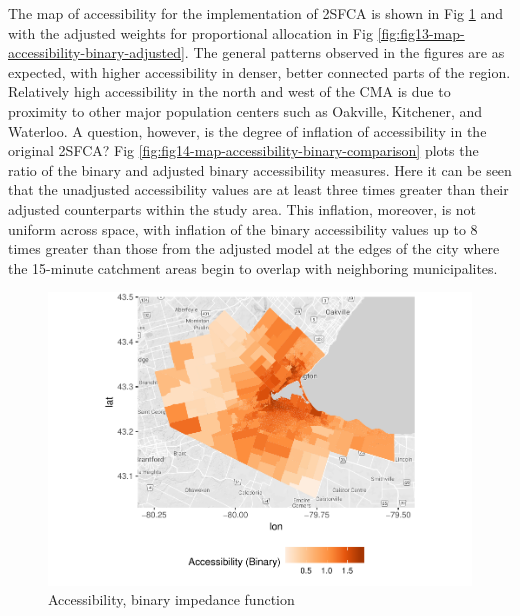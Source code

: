 \documentclass[10pt,letterpaper]{article}
\begin{document}
The map of accessibility for the implementation of 2SFCA is shown in Fig
\ref{fig:fig12-map-accessibility-binary} and with the adjusted weights
for proportional allocation in Fig
\ref{fig:fig13-map-accessibility-binary-adjusted}. The general patterns
observed in the figures are as expected, with higher accessibility in
denser, better connected parts of the region. Relatively high
accessibility in the north and west of the CMA is due to proximity to
other major population centers such as Oakville, Kitchener, and
Waterloo. A question, however, is the degree of inflation of
accessibility in the original 2SFCA? Fig
\ref{fig:fig14-map-accessibility-binary-comparison} plots the ratio of
the binary and adjusted binary accessibility measures. Here it can be
seen that the unadjusted accessibility values are at least three times
greater than their adjusted counterparts within the study area. This
inflation, moreover, is not uniform across space, with inflation of the
binary accessibility values up to 8 times greater than those from the
adjusted model at the edges of the city where the 15-minute catchment
areas begin to overlap with neighboring municipalites.

\begin{figure}
\includegraphics[width=0.95\linewidth]{Supply_and_Demand_Inflation_in_FCA_Methods_v2.0_files/figure-latex/fig12-map-accessibility-binary-1} \caption{\label{fig:fig12-map-accessibility-binary}Accessibility, binary impedance function}\label{fig:fig12-map-accessibility-binary}
\end{figure}
\end{document}
